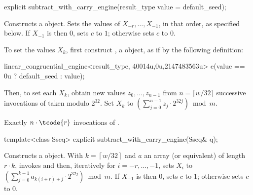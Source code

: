 %
\begin{itemdecl}
explicit subtract_with_carry_engine(result_type value = default_seed);
\end{itemdecl}

\begin{itemdescr}
\pnum\effects Constructs a  object.
 Sets the values of
 $ X_{-r}, \ldots, X_{-1} $,
 in that order, as specified below.
 If $X_{-1}$ is then $0$,
 sets $c$ to $1$;
 otherwise sets $c$ to $0$.

 To set the values $X_k$,
 first construct , a  object,
 as if by the following definition:
\begin{codeblock}
linear_congruential_engine<result_type,
                          40014u,0u,2147483563u> e(value == 0u ? default_seed : value);
\end{codeblock}
 Then, to set each $X_k$,
 obtain new values $ z_0, \ldots, z_{n-1} $
 from $n = \lceil w/32 \rceil $ successive invocations
 of  taken modulo $2^{32}$.
 Set $X_k$ to $ \left( \sum_{j=0}^{n-1} z_j \cdot 2^{32j}\right) \bmod m$.

\pnum\complexity Exactly $n \cdot \tcode{r}$ invocations
 of .
\end{itemdescr}



%
\begin{itemdecl}
template<class Sseq> explicit subtract_with_carry_engine(Sseq& q);
\end{itemdecl}

\begin{itemdescr}
\pnum\effects Constructs a  object.
 With
 $ k = \left\lceil w / 32 \right\rceil $
 and $a$ an array (or equivalent)
 of length $ r \cdot k $,
 invokes 
 and then, iteratively for $i = -r, \ldots, -1$,
 sets $X_i$
 to $ \left(\sum_{j=0}^{k-1}a_{k(i+r)+j} \cdot 2^{32j} \right) \bmod m $.
 If $X_{-1}$ is then $0$,
 sets $c$ to $1$;
 otherwise sets $c$ to $0$.
\end{itemdescr}




